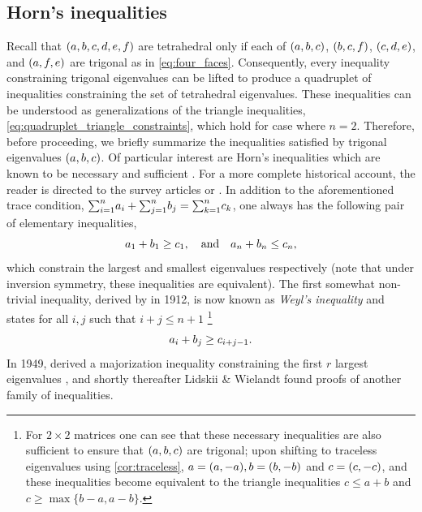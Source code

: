 \documentclass[notitlepage, 10pt]{article}
\begin{document}
\subsection{Horn's inequalities}
Recall that $(a,b,c,d,e,f)$ are tetrahedral only if each of $(a,b,c)$, $(b, c, f)$, $(c,d,e)$, and $(a,f,e)$ are trigonal as in \cref{eq:four_faces}.
Consequently, every inequality constraining trigonal eigenvalues can be lifted to produce a quadruplet of inequalities constraining the set of tetrahedral eigenvalues.
These inequalities can be understood as generalizations of the triangle inequalities, \cref{eq:quadruplet_triangle_constraints}, which hold for case where $n=2$.
Therefore, before proceeding, we briefly summarize the inequalities satisfied by trigonal eigenvalues $(a,b,c)$.
Of particular interest are Horn's inequalities \cite{horn1962eigenvalues} which are known to be necessary and sufficient \cite{klyachko1998stable,knutson1999honeycomb}.
For a more complete historical account, the reader is directed to the survey articles \cite{bhatia2001linear,fulton1998eigenvalues,knutson2000symplectic} or \cite[Appendix D]{niculescu2006convex}.
In addition to the aforementioned trace condition, ${\sum}_{i=1}^{n}a_i + {\sum}_{j=1}^{n}b_j = {\sum}_{k=1}^{n}c_k$, one always has the following pair of elementary inequalities,
\begin{equation}
    a_1 + b_1 \geq c_1, \quad \text{and} \quad a_n + b_n \leq c_n,
\end{equation}
which constrain the largest and smallest eigenvalues respectively (note that under inversion symmetry, these inequalities are equivalent). 
The first somewhat non-trivial inequality, derived by \citeauthor{weyl1912asymptotische} in 1912, is now known as \textit{Weyl's inequality} and states for all $i,j$ such that $i+j \leq n+1$ \cite{weyl1912asymptotische}\footnote{For $2\times 2$ matrices one can see that these necessary inequalities are also sufficient to ensure that $(a,b,c)$ are trigonal; upon shifting to traceless eigenvalues using \cref{cor:traceless}, $a = (a,-a), b = (b, -b)$ and $c = (c,-c)$, and these inequalities become equivalent to the triangle inequalities $c \leq a+b$ and $c \geq \max\{b-a,a-b\}$.}
\begin{equation}
    a_i + b_j \geq c_{i+j-1}.
\end{equation}
In 1949, \citeauthor{fan1949theorem} derived a majorization inequality constraining the first $r$ largest eigenvalues \cite{fan1949theorem}, 
and shortly thereafter Lidskii \cite{lidskii1953proper} \& Wielandt \cite{wielandt1955extremum} found proofs of another family of inequalities.
\end{document}
